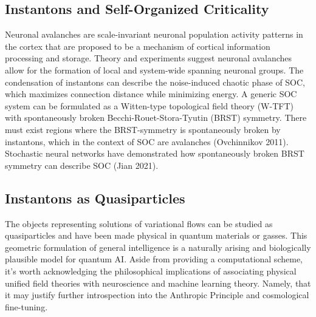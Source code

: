 \documentclass{article}
\begin{document}
\subsection{Instantons and Self-Organized Criticality}
    Neuronal avalanches are scale-invariant neuronal population activity patterns in the cortex that are proposed to be a mechanism of cortical information processing and storage. Theory and experiments suggest neuronal avalanches allow for the formation of local and system-wide spanning neuronal groups. The condensation of instantons can describe the noise-induced chaotic phase of SOC, which maximizes connection distance while minimizing energy. A generic SOC system can be formulated as a Witten-type topological field theory (W-TFT) with spontaneously broken Becchi-Rouet-Stora-Tyutin (BRST) symmetry. There must exist regions where the BRST-symmetry is spontaneously broken by instantons, which in the context of SOC are avalanches (Ovchinnikov 2011). Stochastic neural networks have demonstrated how spontaneously broken BRST symmetry can describe SOC (Jian 2021). 
    





    
    

    \subsection{Instantons as Quasiparticles}
    
    
    
    
    
    
    The objects representing solutions of variational flows can be studied as quasiparticles and have been made physical in quantum materials or gasses. This geometric formulation of general intelligence is a naturally arising and biologically plausible model for quantum AI. Aside from providing a computational scheme, it's worth acknowledging the philosophical implications of associating physical unified field theories with neuroscience and machine learning theory. Namely, that it  may justify further introspection into the Anthropic Principle and cosmological fine-tuning.
    
\end{document}
